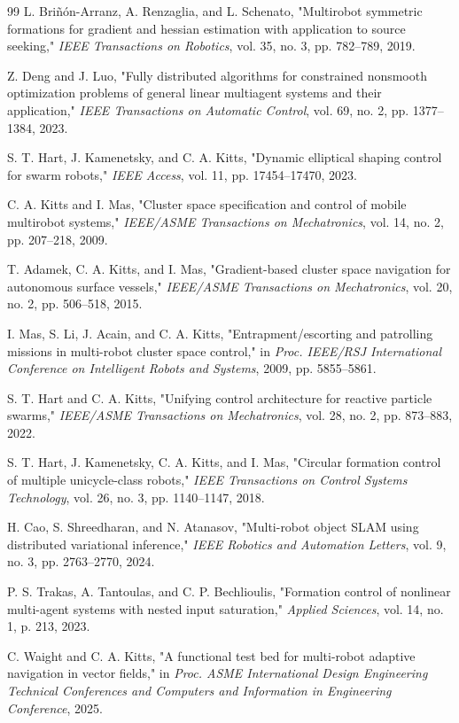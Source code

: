 \documentclass[lettersize,journal]{IEEEtran}
\begin{document}
\begin{thebibliography}{99}
 L. Briñón-Arranz, A. Renzaglia, and L. Schenato, "Multirobot symmetric formations for gradient and hessian estimation with application to source seeking," \textit{IEEE Transactions on Robotics}, vol. 35, no. 3, pp. 782--789, 2019.

 Z. Deng and J. Luo, "Fully distributed algorithms for constrained nonsmooth optimization problems of general linear multiagent systems and their application," \textit{IEEE Transactions on Automatic Control}, vol. 69, no. 2, pp. 1377--1384, 2023.

 S. T. Hart, J. Kamenetsky, and C. A. Kitts, "Dynamic elliptical shaping control for swarm robots," \textit{IEEE Access}, vol. 11, pp. 17454--17470, 2023.

 C. A. Kitts and I. Mas, "Cluster space specification and control of mobile multirobot systems," \textit{IEEE/ASME Transactions on Mechatronics}, vol. 14, no. 2, pp. 207--218, 2009.

 T. Adamek, C. A. Kitts, and I. Mas, "Gradient-based cluster space navigation for autonomous surface vessels," \textit{IEEE/ASME Transactions on Mechatronics}, vol. 20, no. 2, pp. 506--518, 2015.

 I. Mas, S. Li, J. Acain, and C. A. Kitts, "Entrapment/escorting and patrolling missions in multi-robot cluster space control," in \textit{Proc. IEEE/RSJ International Conference on Intelligent Robots and Systems}, 2009, pp. 5855--5861.

 S. T. Hart and C. A. Kitts, "Unifying control architecture for reactive particle swarms," \textit{IEEE/ASME Transactions on Mechatronics}, vol. 28, no. 2, pp. 873--883, 2022.

 S. T. Hart, J. Kamenetsky, C. A. Kitts, and I. Mas, "Circular formation control of multiple unicycle-class robots," \textit{IEEE Transactions on Control Systems Technology}, vol. 26, no. 3, pp. 1140--1147, 2018.

 H. Cao, S. Shreedharan, and N. Atanasov, "Multi-robot object SLAM using distributed variational inference," \textit{IEEE Robotics and Automation Letters}, vol. 9, no. 3, pp. 2763--2770, 2024.

 P. S. Trakas, A. Tantoulas, and C. P. Bechlioulis, "Formation control of nonlinear multi-agent systems with nested input saturation," \textit{Applied Sciences}, vol. 14, no. 1, p. 213, 2023.

 C. Waight and C. A. Kitts, "A functional test bed for multi-robot adaptive navigation in vector fields," in \textit{Proc. ASME International Design Engineering Technical Conferences and Computers and Information in Engineering Conference}, 2025.


\end{thebibliography}
\end{document}
